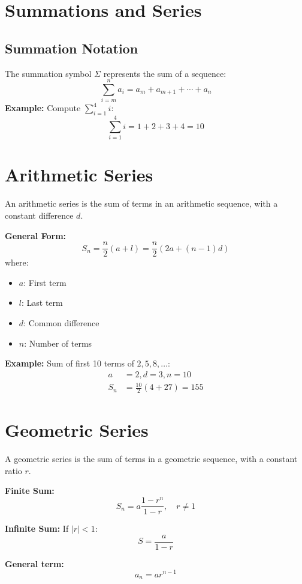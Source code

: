 \documentclass{article}
\begin{document}
\begin{multicols}{2}

\section*{Summations and Series}

\subsection*{Summation Notation}
The summation symbol \(\Sigma\) represents the sum of a sequence:
\[
\sum_{i=m}^n a_i = a_m + a_{m+1} + \cdots + a_n
\]
\textbf{Example:} Compute \( \sum_{i=1}^4 i \):
\[
\sum_{i=1}^4 i = 1 + 2 + 3 + 4 = 10
\]

\section*{Arithmetic Series}
An arithmetic series is the sum of terms in an arithmetic sequence, with a constant difference \(d\).

\textbf{General Form:}
\[
S_n = \frac{n}{2}(a + l) = \frac{n}{2}(2a + (n-1)d)
\]
where:
\begin{itemize}
    \item \(a\): First term
    \item \(l\): Last term
    \item \(d\): Common difference
    \item \(n\): Number of terms
\end{itemize}

\textbf{Example:} Sum of first 10 terms of \(2, 5, 8, \dots\):
\begin{align*}
    a &= 2, d = 3, n = 10 \\
    S_n &= \frac{10}{2}(4 + 27) = 155
\end{align*}

\section*{Geometric Series}
A geometric series is the sum of terms in a geometric sequence, with a constant ratio \(r\).

\textbf{Finite Sum:}
\[
S_n = a \frac{1-r^n}{1-r}, \quad r \neq 1
\]

\textbf{Infinite Sum:} If \(|r| < 1\):
\[
S = \frac{a}{1-r}
\]

\textbf{General term:}
\[ a_n = a r^{n-1} \]


\end{multicols}
\end{document}
